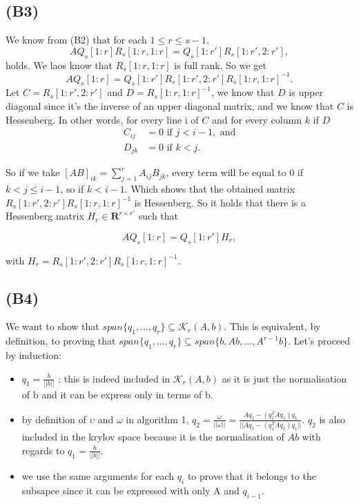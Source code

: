 \documentclass{article}
\begin{document}
\subsection*{(B3)}
We know from (B2) that for each $1 \leq r \leq s-1$, 
\[
A Q_s[1:r] R_s[1:r, 1:r] = Q_s[1:r'] R_s[1:r', 2:r'],
\]
holds. We laos know that $R_s[1:r, 1:r]$ is full rank. So we get 
\[
A Q_s[1:r]  = Q_s[1:r'] R_s[1:r', 2:r']R_s[1:r, 1:r]^{-1}.
\]
Let $C=R_s[1:r', 2:r']$ and $D=R_s[1:r, 1:r]^{-1}$, we know that $D$ is upper diagonal since it's the inverse of an upper diagonal matrix, and we know that $C$ is Hessenberg. In other words, for every line i of $C$ and for every column $k$ if $D$
\begin{align*}
    C_{ij} &= 0 \text{ if } j < i-1, \text{ and} \\
    D_{jk} &= 0 \text{ if } k < j.
\end{align*}

So if we take \([AB]_{ik}=\sum_{j=1}^{r}A_{ij}B_{jk}\), every term will be equal to \(0\) if \(k<j\leq i-1\), so if \(k < i-1\). Which shows that the obtained matrix \(R_s[1:r', 2:r']R_s[1:r, 1:r]^{-1}\) is Hessenberg. So it holds that there is a Hessenberg matrix \(H_r\in \mathbf{R}^{r\times r'}\) such that

\[
A Q_s[1:r]  = Q_s[1:r'] H_r,
\]

with \(H_r=R_s[1:r', 2:r']R_s[1:r, 1:r]^{-1}\).


\subsection*{(B4)}
We want to show that $span\{q_1, ... , q_r\} \subseteq \mathcal{K}_r(A,b)$. This is equivalent, by definition, 
to proving that  $span\{q_1, ... , q_r\} \subseteq span \{ b, Ab,..., A^{r-1}b\}$.
Let's proceed by induction: 
\begin{itemize}
    \item $q_1 = \frac{b}{||b||}$ : this is indeed included in $\mathcal{K}_r(A,b)$ as it is just the normalisation of b
    and it can be express only in terms of b. 
    \item by definition of $\upsilon$ and $ \omega$ in algorithm 1, 
    $q_2 = \frac{\omega}{||\omega||} = \frac{A q_1 - (q_1^T A q_1)q_1}{||A q_1 - (q_1^T A q_1)q_1||}$. $q_2$ is also included in the krylov space because it is the normalisation of $Ab$ with regards to $q_1 = \frac{b}{||b||}$. 
    \item we use the same arguments for each $q_i$ to prove that it belongs to the subsapce since it can be expressed with only A and $q_{i-1}$. 
\end{itemize}
\end{document}
